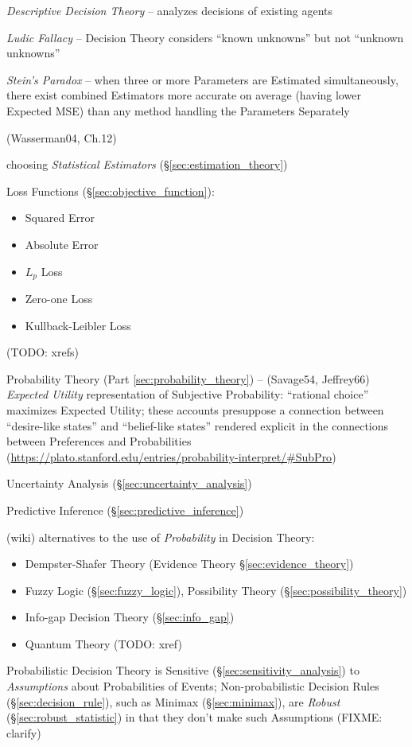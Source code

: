 \emph{Descriptive Decision Theory} -- analyzes decisions of existing agents

\emph{Ludic Fallacy} -- Decision Theory considers ``known unknowns'' but not
``unknown unknowns''

\emph{Stein's Paradox} -- when three or more Parameters are Estimated
simultaneously, there exist combined Estimators more accurate on average (having
lower Expected MSE) than any method handling the Parameters Separately

(Wasserman04, Ch.12)

choosing \emph{Statistical Estimators} (\S\ref{sec:estimation_theory})

Loss Functions (\S\ref{sec:objective_function}):
\begin{itemize}
  \item Squared Error
  \item Absolute Error
  \item $L_p$ Loss
  \item Zero-one Loss
  \item Kullback-Leibler Loss
\end{itemize}
(TODO: xrefs)

\fist Probability Theory (Part \ref{sec:probability_theory}) -- (Savage54,
Jeffrey66) \emph{Expected Utility} representation of Subjective Probability:
``rational choice'' maximizes Expected Utility; these accounts presuppose a
connection between ``desire-like states'' and ``belief-like states'' rendered
explicit in the connections between Preferences and Probabilities
(\url{https://plato.stanford.edu/entries/probability-interpret/#SubPro})

\fist Uncertainty Analysis (\S\ref{sec:uncertainty_analysis})

\fist Predictive Inference (\S\ref{sec:predictive_inference})

(wiki) alternatives to the use of \emph{Probability} in Decision Theory:
\begin{itemize}
  \item Dempster-Shafer Theory (Evidence Theory \S\ref{sec:evidence_theory})
  \item Fuzzy Logic (\S\ref{sec:fuzzy_logic}), Possibility Theory
    (\S\ref{sec:possibility_theory})
  \item Info-gap Decision Theory (\S\ref{sec:info_gap})
  \item Quantum Theory (TODO: xref)
\end{itemize}
Probabilistic Decision Theory is Sensitive (\S\ref{sec:sensitivity_analysis}) to
\emph{Assumptions} about Probabilities of Events; Non-probabilistic Decision
Rules (\S\ref{sec:decision_rule}), such as Minimax (\S\ref{sec:minimax}), are
\emph{Robust} (\S\ref{sec:robust_statistic}) in that they don't make such
Assumptions (FIXME: clarify)



